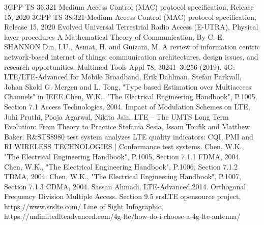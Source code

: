 \begin{thebibliography}{9}
3GPP TS 36.321 Medium Access Control (MAC) protocol specification, Release 15, 2020
3GPP TS 38.321 Medium Access Control (MAC) protocol specification, Release 15, 2020
Evolved Universal Terrestrial Radio Access (E-UTRA), Physical layer procedures 
A Mathematical Theory of Communication, By C. E. SHANNON
Din, I.U., Asmat, H. and Guizani, M. A review of information centric network-based internet of things: communication architectures, design issues, and research opportunities. Multimed Tools Appl 78, 30241–30256 (2019). 
4G: LTE/LTE-Advanced for Mobile Broadband, Erik Dahlman, Stefan Parkvall, Johan Skold
G. Mergen and L. Tong, "Type based Estimation over Multiaccess Channels" in IEEE 
Chen, W.K., "The Electrical Engineering Handbook", P.1005, Section 7.1 Access Technologies, 2004.
Impact of Modulation Schemes on LTE, Juhi Pruthi, Pooja Agarwal, Nikita Jain.
LTE – The UMTS Long Term Evolution: From Theory to Practice Stefania Sesia, Issam Toufik and Matthew Baker.
R\&STS8980 test system analyzes LTE quality indicators: CQI, PMI and RI
WIRELESS TECHNOLOGIES | Conformance test systems. 
Chen, W.K., "The Electrical Engineering Handbook", P.1005, Section 7.1.1 FDMA, 2004. 
Chen, W.K., "The Electrical Engineering Handbook", P.1006, Section 7.1.2 TDMA, 2004.
Chen, W.K., "The Electrical Engineering Handbook", P.1007, Section 7.1.3 CDMA, 2004.
Sassan Ahmadi, LTE-Advanced,2014. Orthogonal Frequency Division Multiple Access. Section 9.5
srsLTE opensource project, https://www.srslte.com/ 
Line of Sight Infographic, https://unlimitedlteadvanced.com/4g-lte/how-do-i-choose-a-4g-lte-antenna/
\end{thebibliography}